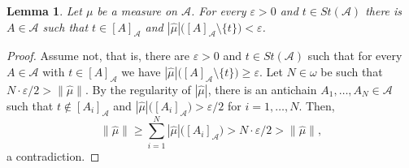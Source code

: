 \documentclass[a4paper,11pt,fleqn]{amsart}
\newtheorem{lemma}[theorem]{Lemma}
\theoremstyle{definition}
\theoremstyle{remark}
\numberwithin{equation}{section}
\newcommand{\eps}{\varepsilon}
\newcommand{\N}{\mathbb{N}}
\newcommand{\aA}{\mathcal{A}}
\newcommand{\sm}{\setminus}
\newcommand{\wh}{\widehat}
\newcommand{\clopen}[1]{\left[#1\right]}
\newcommand{\iA}{\in\aA}
\newcommand{\io}{\in\omega}%
\begin{document}
\begin{lemma}\label{lemma:small_nhbds}
Let $\mu$ be a measure on $\aA$. For every $\eps>0$ and $t\in St(\aA)$ there is $A\iA$ such that $t\in \clopen{A}_\aA$ and $|\wh{\mu}|\big(\clopen{A}_\aA\sm\{t\}\big)<\eps$.
\end{lemma}
\begin{proof}
Assume not, that is, there are $\eps>0$ and $t\in St(\aA)$ such that for every $A\iA$ with $t\in\clopen{A}_\aA$ we have $|\wh{\mu}|\big(\clopen{A}_\aA\sm\{t\}\big)\ge\eps$. Let $N\io$ be such that $N\cdot\eps/2>\|\wh{\mu}\|$. By the regularity of $|\wh{\mu}|$, there is an antichain $A_1,\ldots,A_N\in\aA$ such that $t\not\in\clopen{A_i}_\aA$ and $|\wh{\mu}|\big(\clopen{A_i}_\aA\big)>\eps/2$ for $i=1,\ldots,N$. Then,
\[\|\wh{\mu}\|\ge\sum_{i=1}^N|\wh{\mu}|\big(\clopen{A_i}_\aA\big)>N\cdot\eps/2>\|\wh{\mu}\|,\]
a contradiction.
\end{proof}
\end{document}
